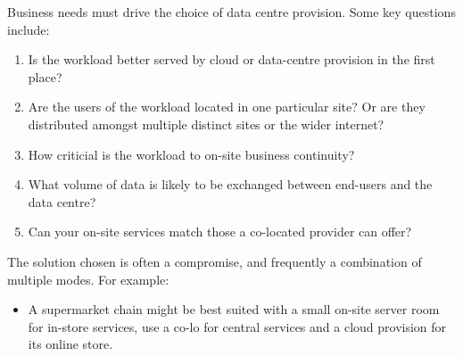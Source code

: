 \documentclass{pgnotes}
\begin{document}
Business needs must drive the choice of data centre provision.
Some key questions include:
\begin{enumerate}
\item Is the workload better served by cloud or data-centre provision in the first place?
\item Are the users of the workload located in one particular site? Or are they distributed amongst multiple distinct sites or the wider internet? 
\item How criticial is the workload to on-site business continuity?
\item What volume of data is likely to be exchanged between end-users and the data centre?
\item Can your on-site services match those a co-located provider can offer? 
\end{enumerate}
The solution chosen is often a compromise, and frequently a combination of multiple modes. For example:
\begin{itemize}
\item  A supermarket chain might be best suited with a small on-site server room for in-store services, use a co-lo for central services and a cloud provision for its online store.
\end{itemize}
\end{document}
